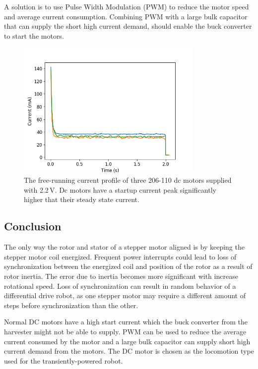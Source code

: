 A solution is to use Pulse Width Modulation (PWM) to reduce the motor speed and average current consumption.
Combining PWM with a large bulk capacitor that can supply the short high current demand, should enable the buck converter to start the motors.

\begin{figure}%
	\centering
	\includegraphics[width=0.8\textwidth]{pics/free_running_current.png}
	\caption{The free-running current profile of three 206-110 dc motors supplied with 2.2\,V. Dc motors have a startup current peak significantly higher that their steady state current.}
	\label{fig:free_running_current}
\end{figure}

\subsection{Conclusion}
The only way the rotor and stator of a stepper motor aligned is by keeping the stepper motor coil energized.
Frequent power interrupts could lead to loss of synchronization between the energized coil and position of the rotor as a result of rotor inertia.
The error due to inertia becomes more significant with increase rotational speed.
Loss of synchronization can result in random behavior of a differential drive robot, as one stepper motor may require a different amount of steps before synchronization than the other.

Normal DC motors have a high start current which the buck converter from the harvester might not be able to supply.
PWM can be used to reduce the average current consumed by the motor and a large bulk capacitor can supply short high current demand from the motors.
The DC motor is chosen as the locomotion type used for the transiently-powered robot.
